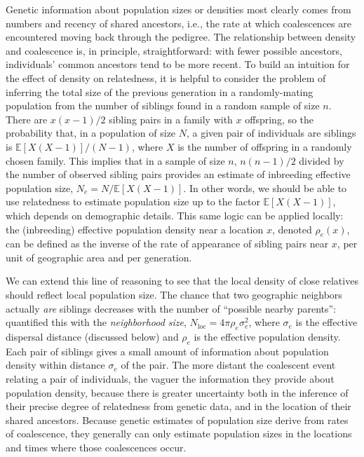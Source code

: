 \documentclass{ar-1col}
\renewcommand{\emph}[1]{{\textit{#1}}}
\newcommand{\E}{\mathbb{E}}
\begin{document}
Genetic information about population sizes or densities most clearly
comes from numbers and recency of shared ancestors, 
i.e., the rate at which coalescences are encountered moving back through the pedigree.
The relationship between density and coalescence is, in principle, straightforward:
with fewer possible ancestors,
individuals' common ancestors tend to be more recent.
To build an intuition for the effect of density on relatedness,
it is helpful to consider 
the problem of inferring the total size of the previous generation
in a randomly-mating population
from the number of siblings found in a random sample of size $n$.
There are $x (x-1) / 2$ sibling pairs in a family with $x$ offspring,
so the probability that, 
in a population of size $N$, 
a given pair of individuals are siblings
is $\E[X (X-1)] / (N-1)$, where $X$ is the number of offspring in a randomly chosen family.
This implies that in a sample of size $n$,
$n(n-1)/2$ divided by the number of observed sibling pairs 
provides an estimate of inbreeding effective population size, $N_e = N/\E[X(X-1)]$.
In other words, we should be able to use relatedness to estimate population size
up to the factor $\E[X(X-1)]$, which depends on demographic details. 
This same logic can be applied locally:
the (inbreeding) effective population density
near a location $x$, denoted $\rho_e(x)$,
can be defined as the inverse of the rate of appearance of sibling pairs
near $x$, per unit of geographic area and per generation.

We can extend this line of reasoning to see that 
the local density of close relatives
should reflect local population size.
The chance that two geographic neighbors actually \emph{are} siblings 
decreases with the number of ``possible nearby parents'':
\citet{wright1946isolation} quantified this with the
\emph{neighborhood size}, 
$N_\text{loc} = 4 \pi \rho_e \sigma_e^2$,
where $\sigma_e$ is the effective dispersal distance (discussed below)
and $\rho_e$ is the effective population density.
Each pair of siblings gives a small amount of information
about population density within distance $\sigma_e$ of the pair.
The more distant the coalescent event relating a pair of individuals, 
the vaguer the information they provide about population density,
because there is greater uncertainty 
both in the inference of their precise degree of relatedness from genetic data,
and in the location of their shared ancestors.
Because genetic estimates of population size 
derive from rates of coalescence,
they generally can only estimate population sizes 
in the locations and times where those coalescences occur.
\end{document}
